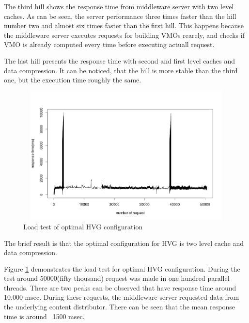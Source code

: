 The third hill shows the response time from middleware server with two level caches. As can be seen, the server performance three times faster than the hill number two and almost six times faster than the first hill. This happens because the middleware server executes requests for building VMOs rearely, and checks if VMO is already computed every time before executing actuall request. 

The last hill presents the response time with second and first level caches and data compression. It can be noticed, that the hill is more stable than the third one, but the execution time roughly the same.


\begin{figure}[h!]
    \centering
    \includegraphics[width=15cm,height=7cm,keepaspectratio]{images/hql_loadtest.png}
    \caption{Load test of optimal HVG configuration}
    \label{fig:hvg_loadtest}
\end{figure}

The brief result is that the optimal configuration for HVG is two level cache and data compression.


Figure \ref{fig:hvg_loadtest} demonstrates the load test for optimal HVG configuration. During the test around 50000(fifty thousand) request was made in one hundred parallel threads. There are two peaks can be observed that have response time around 10.000 msec. During these requests, the middleware server requested data from the underlying content distributor. There can be seen that the mean response time is around ~1500 msec.


